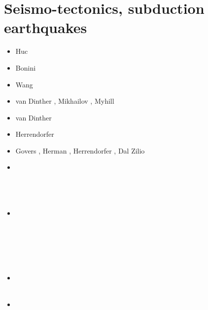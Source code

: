\begin{scriptsize}
\cite{raju91}
\cite{haeh93}
\cite{leru95}
\cite{duto98}
\cite{wade03}
\cite{wade04}
\cite{utne08}
\end{scriptsize}

\section{Seismo-tectonics, subduction earthquakes}

\begin{scriptsize}
\begin{itemize}
\item[\nineteenninetyeight] Huc \etal \cite{huhc98}
\item[\twothousandthree] Bonini \etal \cite{bocs03}
\item[\twothousandtwelve] Wang \etal \cite{wahh12}
\item[\twothousandthirteen] van Dinther \etal \cite{vagd13a,vagd13b}, Mikhailov \cite{milp13},
                            Myhill \cite{myhi13}
\item[\twothousandfourteen] van Dinther \etal \cite{vamd14}
\item[\twothousandfifteen] Herrendorfer \etal \cite{hevg15}
\item[\twothousandeighteen] Govers \etal \cite{gofv18}, Herman \etal \cite{hefg18}, 
                            Herrendorfer \etal \cite{hegv18}, Dal Zilio \etal \cite{davg18}
\item[\twothousandnineteen] 
\textcite{vawg19} \\ 
\textcite{vanzelst} \\
\textcite{vakf19} \\
\textcite{davg19} \\
\item[\twothousandtwenty] 
\textcite{brvf20} \\
\textcite{pegy20} \\
\textcite{dadm20} \\
\textcite{mabb20} \\
\textcite{hego20} \\
\textcite{soca20} \\
\item[\twothousandtwentyone] 
\textcite{jamp21} \\
\textcite{begc21} \\
\item[\twothousandtwentytwo] 
\textcite{toyp22} \\
\textcite{dage22} \\
\textcite{dala22} \\
\textcite{zugc22} 
\end{itemize}
\end{scriptsize}

